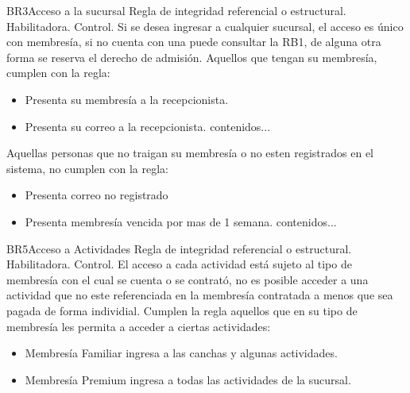 \begin{BussinesRule}{BR3}{Acceso a la sucursal}
	\BRitem[Tipo:] Regla de integridad referencial o estructural.
	\BRitem[Clase:] Habilitadora. 
	\BRitem[Nivel:] Control. %
	\BRitem[Descripción:] Si se desea ingresar a cualquier sucursal, el acceso es único con membresía, si no cuenta con una puede consultar la RB1, de alguna otra forma se reserva el derecho de admisión.
	 Aquellos que tengan su membresía, cumplen con la regla:
		\begin{itemize}
			\item Presenta su membresía a la recepcionista.
			\item Presenta su correo a la recepcionista.
			contenidos...
		\end{itemize}
	
	 Aquellas personas que no traigan su membresía o no esten registrados en el sistema, no cumplen con la regla:
		\begin{itemize}
			\item Presenta correo no registrado
			\item Presenta membresía vencida por mas de 1 semana.
			contenidos...
		\end{itemize}
	
\end{BussinesRule}

\begin{BussinesRule}{BR5}{Acceso a Actividades}
	\BRitem[Tipo:] Regla de integridad referencial o estructural.
	\BRitem[Clase:] Habilitadora. 
	\BRitem[Nivel:] Control. %
	\BRitem[Descripción:] El acceso a cada actividad está sujeto al tipo de membresía con el cual se cuenta o se contrató, no es posible acceder a una actividad que no este referenciada en la membresía contratada a menos que sea pagada de forma individial.
	 Cumplen la regla aquellos que en su tipo de membresía les permita a acceder a ciertas actividades:
		\begin{itemize}
			\item Membresía Familiar ingresa a las canchas y algunas actividades.
			 \item Membresía Premium ingresa a todas las actividades de la sucursal.
		\end{itemize}
	
	
\end{BussinesRule}

